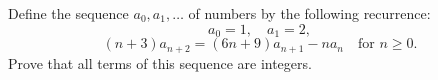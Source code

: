\documentclass{article}
\begin{document}
\setlength{\parindent}{0pt}
Define the sequence \(\displaystyle a_0,a_1,\ldots\) of numbers by the following recurrence:$$a_0=1, \quad a_1=2,$$$$(n+3)a_{n+2}=(6n+9)a_{n+1}- na_n \quad\text{for \(\displaystyle n\ge 0\).}$$Prove that all terms of this sequence are integers.
\end{document}
